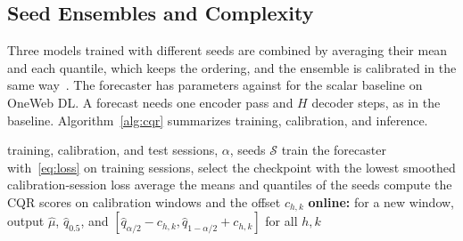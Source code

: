 \subsection{Seed Ensembles and Complexity}
Three models trained with different seeds are combined by averaging their mean and each quantile, which keeps the ordering, and the ensemble is calibrated in the same way~\cite{lakshminarayanan2017simple}. The forecaster has \ParamsDist{} parameters against \ParamsPrev{} for the scalar baseline on OneWeb DL. A forecast needs one encoder pass and $H$ decoder steps, as in the baseline. Algorithm~\ref{alg:cqr} summarizes training, calibration, and inference.

\begin{algorithm}[t]
\caption{Training, calibration, and online use}
\label{alg:cqr}
\begin{algorithmic}[1]
\REQUIRE training, calibration, and test sessions, $\alpha$, seeds $\mathcal{S}$
  \STATE train the forecaster with~\eqref{eq:loss} on training sessions, select the checkpoint with the lowest smoothed calibration-session loss
\ENDFOR
\STATE average the means and quantiles of the seeds
  \STATE compute the CQR scores on calibration windows and the offset $c_{h,k}$
\ENDFOR
\STATE \textbf{online:} for a new window, output $\hat{\mu}$, $\hat{q}_{0.5}$, and $[\hat{q}_{\alpha/2}-c_{h,k},\hat{q}_{1-\alpha/2}+c_{h,k}]$ for all $h,k$
\end{algorithmic}
\end{algorithm}
